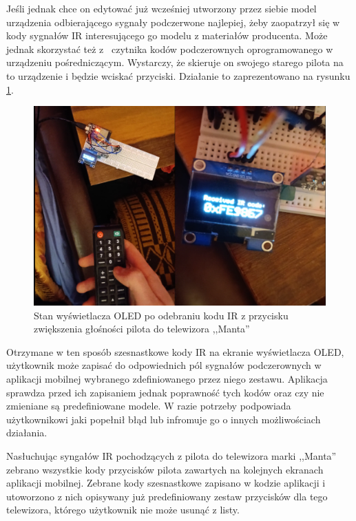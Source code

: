 \documentclass[12pt,twoside]{article}
\begin{document}
Jeśli jednak chce on edytować już wcześniej utworzony przez siebie model urządzenia odbierającego sygnały podczerwone najlepiej, żeby zaopatrzył się w kody sygnałów IR interesującego go modelu z materiałów producenta. Może jednak skorzystać też z~ czytnika kodów podczerownych oprogramowanego w urządzeniu pośredniczącym. Wystarczy, że skieruje on swojego starego pilota na to urządzenie i będzie wciskać przyciski. Działanie to zaprezentowano na rysunku \ref*{Fig:irCodeRemote}.

\begin{figure}[ht]
   \centering
   \includegraphics[width=14cm]{images/irCodeRemote.png}
   \caption{Stan wyświetlacza OLED po odebraniu kodu IR z przycisku zwiększenia głośności pilota do telewizora ,,Manta''}
   \label{Fig:irCodeRemote}
\end{figure}

 Otrzymane w ten sposób szesnastkowe kody IR na ekranie wyświetlacza OLED, użytkownik może zapisać do odpowiednich pól sygnałów podczerownych w aplikacji mobilnej wybranego zdefiniowanego przez niego zestawu. Aplikacja sprawdza przed ich zapisaniem jednak poprawność tych kodów oraz czy nie zmieniane są predefiniowane modele. W razie potrzeby podpowiada użytkownikowi jaki popełnił błąd lub infromuje go o innych możliwościach działania.

 Nasłuchując syngałów IR pochodzących z pilota do telewizora marki ,,Manta'' zebrano wszystkie kody przycisków pilota zawartych na kolejnych ekranach aplikacji mobilnej. Zebrane kody szesnastkowe zapisano w kodzie aplikacji i utoworzono z nich opisywany już predefiniowany zestaw przycisków dla tego telewizora, którego użytkownik nie może usunąć z listy.
\end{document}
